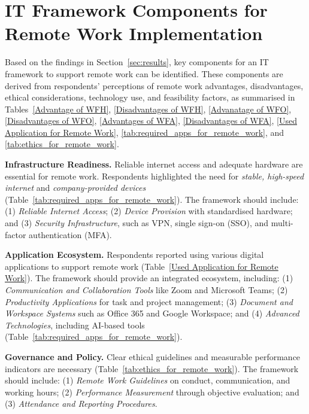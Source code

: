 \documentclass[conference]{IEEEtran}
\begin{document}
\section{IT Framework Components for Remote Work Implementation}
\label{sec:it-framework}


Based on the findings in Section~\ref{sec:results}, key components for an IT framework to support remote work can be identified. These components are derived from respondents’ perceptions of remote work advantages, disadvantages, ethical considerations, technology use, and feasibility factors, as summarised in Tables~\ref{Advantage of WFH}, \ref{Disadvantages of WFH}, \ref{Advanatage of WFO}, \ref{Disadvantages of WFO}, \ref{Advantages of WFA}, \ref{Disadvantages of WFA}, \ref{Used Application for Remote Work}, \ref{tab:required_apps_for_remote_work}, and \ref{tab:ethics_for_remote_work}.

\textbf{Infrastructure Readiness.}
Reliable internet access and adequate hardware are essential for remote work. Respondents highlighted the need for \textit{stable, high-speed internet} and \textit{company-provided devices} (Table~\ref{tab:required_apps_for_remote_work}). The framework should include: (1) \textit{Reliable Internet Access}; (2) \textit{Device Provision} with standardised hardware; and (3) \textit{Security Infrastructure}, such as VPN, single sign-on (SSO), and multi-factor authentication (MFA).

\textbf{Application Ecosystem.}
Respondents reported using various digital applications to support remote work (Table~\ref{Used Application for Remote Work}). The framework should provide an integrated ecosystem, including: (1) \textit{Communication and Collaboration Tools} like Zoom and Microsoft Teams; (2) \textit{Productivity Applications} for task and project management; (3) \textit{Document and Workspace Systems} such as Office 365 and Google Workspace; and (4) \textit{Advanced Technologies}, including AI-based tools (Table~\ref{tab:required_apps_for_remote_work}).

\textbf{Governance and Policy.}
Clear ethical guidelines and measurable performance indicators are necessary (Table~\ref{tab:ethics_for_remote_work}). The framework should include: (1) \textit{Remote Work Guidelines} on conduct, communication, and working hours; (2) \textit{Performance Measurement} through objective evaluation; and (3) \textit{Attendance and Reporting Procedures}.
\end{document}
